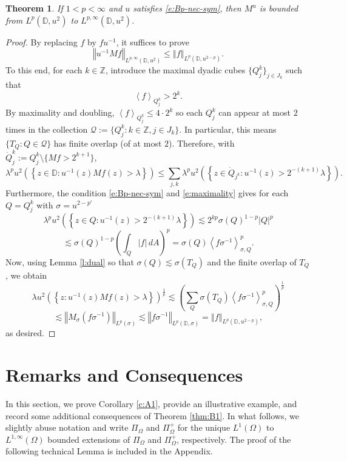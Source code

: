 \documentclass{amsart}
\newcommand{\norm}[1]{\left\Vert {#1}\right\Vert}
\newcommand{\avg}[1]{\left\langle {#1}\right\rangle}
\newtheorem{theorem}{Theorem}[section]
\theoremstyle{definition}
\numberwithin{equation}{section}
\begin{document}
\begin{theorem}\label{thm:max-p} If $1<p<\infty$ and $u$ satisfies \eqref{e:Bp-nec-sym}, then $M^u$ is bounded from $L^p(\mathbb{D},u^2)$ to $L^{p,\infty}(\mathbb{D},u^2)$.
\end{theorem}



\begin{proof}
By replacing $f$ by $fu^{-1}$, it suffices to prove
    \[ \norm{ u^{-1} Mf}_{L^{p,\infty}(\mathbb{D},u^2)} \le \norm{f}_{L^p(\mathbb{D},u^{2-p})}. \]
To this end, for each $k\in \mathbb Z$, introduce the maximal dyadic cubes $\{Q_j^k\}_{j \in J_k}$ such that
    \begin{equation}\label{e:maximality} \avg{f}_{Q_j^k} > 2^k.\end{equation}
By maximality and doubling, $\avg{f}_{Q_j^k} \le 4 \cdot 2^k$ so each $Q_{j}^k$ can appear at most $2$ times in the collection $\mathcal Q:=\{ Q_j^k\colon k \in \mathbb Z, j \in J_k\}$. In particular, this means $\{T_Q \colon Q \in \mathcal Q\}$ has finite overlap (of at most $2$). Therefore, with $\dot Q_{j}^k := Q_{j}^k \setminus \{Mf > 2^{k+1}\}$, 
    \[ \lambda^p u^2 \left( \left\{ z \in \mathbb D \colon u^{-1}(z) Mf(z) > \lambda \right\} \right) \le \sum_{j,k}  \lambda^p u^2\left( \left\{ z \in \dot Q_{j^k} \colon u^{-1}(z) > 2^{-(k+1)} \lambda \right\} \right). \]
Furthermore, the condition \eqref{e:Bp-nec-sym} and \eqref{e:maximality} gives for each $Q=Q_j^k$ with $\sigma=u^{2-p'}$  
    \[\lambda^p u^2\left(\left\{ z \in Q \colon u^{-1}(z) > 2^{-(k+1)} \lambda \right\} \right) \lesssim 2^{kp} \sigma(Q)^{1-p} |Q|^p \]
    \[ \lesssim \sigma(Q)^{1-p} \left( \int_{Q}|f| \, dA \right)^p = \sigma(Q) \avg{f\sigma^{-1}}_{\sigma,Q}^p.\]
Now, using Lemma \ref{l:dual} so that $\sigma(Q) \lesssim \sigma(T_Q)$ and the finite overlap of $T_Q$, we obtain
    \[ \lambda u^2 \left( \left\{  z \colon u^{-1}(z) Mf(z) > \lambda \right\} \right)^{\frac 1p} \lesssim \left( \sum_{Q} \sigma(T_Q) \avg{f\sigma^{-1}}_{\sigma,Q}^p \right)^{\frac 1p} \]
    \[ \lesssim \norm{M_{\sigma}(f\sigma^{-1})}_{L^p(\sigma)} \lesssim \norm{ f\sigma^{-1}}_{L^p(\mathbb{D},\sigma)} = \norm{f}_{L^p(\mathbb{D},u^{2-p})},\]
as desired.
\end{proof}

\section{Remarks and Consequences} \label{s:RC}
In this section, we prove Corollary \ref{c:A1}, provide an illustrative example, and record some additional consequences of Theorem \ref{thm:B1}. In what follows, we slightly abuse notation and write $\Pi_{\Omega}$ and $\Pi_{\Omega}^{+}$ for the unique $L^1(\Omega)$ to $L^{1,\infty}(\Omega)$ bounded extensions of $\Pi_{\Omega}$ and $\Pi_{\Omega}^{+}$, respectively. The proof of the following technical Lemma is included in the Appendix.
\end{document}
